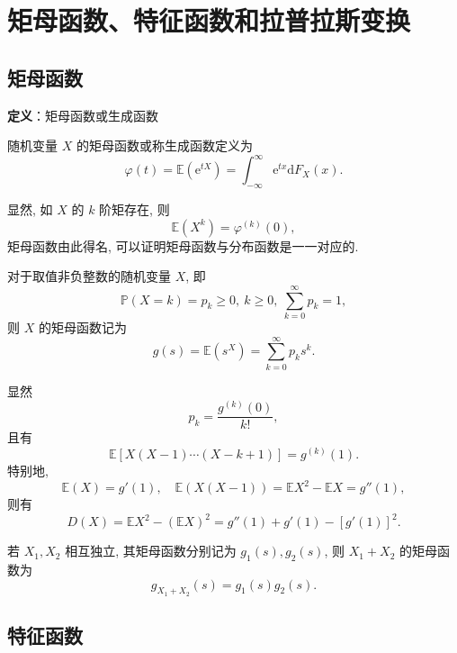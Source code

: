 \documentclass[openany]{ctexbook}
\theoremstyle{kaiti}
\theoremstyle{normal}
\begin{document}
\section{矩母函数、特征函数和拉普拉斯变换}

\subsection{矩母函数}

\textbf{定义}：矩母函数或生成函数

随机变量 $X$ 的矩母函数或称生成函数定义为
\begin{equation}
  \varphi(t)=\mathbb{E}(\mathrm{e}^{tX})=\int_{-\infty}^\infty\mathrm{e}^{tx}\mathrm{d}F_X(x).
\end{equation}

显然, 如 $X$ 的 $k$ 阶矩存在, 则
\begin{equation}
\mathbb{E}(X^k)=\varphi^{(k)}(0),\end{equation} 矩母函数由此得名, 可以证明矩母函数与分布函数是一一对应的.

对于取值非负整数的随机变量 $X$, 即
\begin{equation}
  \mathbb{P}(X=k)=p_k\geqslant0,~k\geqslant0,~\sum_{k=0}^\infty p_k=1,
\end{equation}
则 $X$ 的矩母函数记为
\begin{equation}
  g(s)=\mathbb{E}(s^X)=\sum_{k=0}^\infty p_ks^k.
\end{equation}

显然
\begin{equation}
  p_k=\frac{g^{(k)}(0)}{k!},
\end{equation}
且有
\begin{equation}
  \mathbb{E}[X(X-1)\cdots(X-k+1)]=g^{(k)}(1).
\end{equation}
特别地,
\begin{equation}
  \mathbb{E}(X)=g'(1),\quad \mathbb{E}(X(X-1))=\mathbb{E}X^2-\mathbb{E}X=g''(1),
\end{equation}
则有
\begin{equation}
  D(X)=\mathbb{E}X^2-(\mathbb{E}X)^2=g''(1)+g'(1)-[g'(1)]^2.
\end{equation}

若 $X_1,X_2$ 相互独立, 其矩母函数分别记为 $g_1(s),g_2(s)$, 则 $X_1+X_2$ 的矩母函数为
\begin{equation}
  g_{X_1+X_2}(s)=g_1(s)g_2(s).
\end{equation}

\subsection{特征函数}
\end{document}
